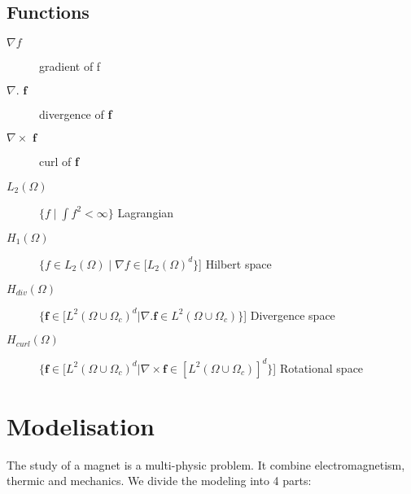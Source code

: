 \documentclass[11pt]{amsart}
\begin{document}
\hypertarget{x-functions}{\subsection{Functions}}
\begin{description}

\item[$\nabla f$]gradient of f

\item[$\nabla.\textbf{ f }$]divergence of \textbf{f}

\item[$\nabla \times \textbf{ f }$]curl of \textbf{f}

\item[$L_{2}(\Omega)$]$\{f  \mid \int f^{2} < \infty\}$  Lagrangian

\item[$H_{1}(\Omega)$]$\{f \in L_{2}(\Omega) \mid \nabla f \in [L_{2}(\Omega)^{d}\}$]  Hilbert space

\item[$H_{div}(\Omega)$]$\{\textbf{f}\in [L^{2} (\Omega\cup\Omega_{c})^{d}| \nabla.\textbf{f}\in L^{2}(\Omega\cup\Omega_{c})\}$] Divergence space

\item[$H_{curl}(\Omega)$]$\{\textbf{f}\in [L^{2} (\Omega\cup\Omega_{c})^{d}| \nabla\times\textbf{f}\in [L^{2} (\Omega\cup\Omega_{c})]^{d}\}$] Rotational space

\end{description}


\hypertarget{x-\textbf{modelisation}}{\section{\textbf{Modelisation}}}
The study of a magnet is a multi-physic problem. It combine electromagnetism, thermic and mechanics.
We divide the modeling into 4 parts:
\end{document}
